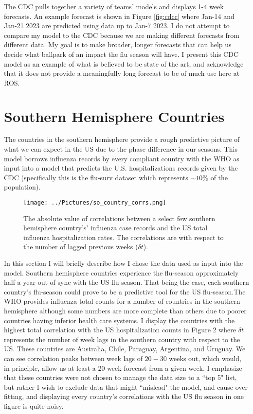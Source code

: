 \documentclass[12pt,a4paper,english]{article}
\begin{document}
The CDC pulls together a variety of teams' models and displays 1-4 week forecasts. An example forecast is shown in Figure \ref{fig:cdcc} where Jan-14 and Jan-21 2023 are predicted using data up to Jan-7 2023. I do not attempt to compare my model to the CDC because we are making different forecasts from different data. My goal is to make broader, longer forecasts that can help us decide what ballpark of an impact the flu season will have. I present this CDC model as an example of what is believed to be state of the art, and acknowledge that it does not provide a meaningfully long forecast to be of much use here at ROS. 




\section{Southern Hemisphere Countries}

The countries in the southern hemisphere provide a rough predictive picture of what we can expect in the US due to the phase difference in our seasons.  This model borrows influenza records by every compliant country with the WHO as input into a model that predicts the U.S. hospitalizations records given by the CDC (specifically this is the flu-surv dataset which represents $\sim10\%$ of the population).  

\begin{figure}[h!]
		\begin{center}
		\texttt{[image: ../Pictures/so\_country\_corrs.png]}
		\caption{The absolute value of correlations between a select few southern hemisphere country's' influenza case records and the US total influenza hospitalization rates. The correlations are with respect to the number of lagged previous weeks ($\delta t$).}
		\end{center}
		\label{fig:so_corrs}
	\end{figure}
\FloatBarrier

In this section I will briefly describe how I chose the data used as input into the model. Southern hemisphere countries experience the flu-season approximately half a year out of sync with the US flu-season. That being the case, each southern country's flu-season could prove to be a predictive tool for the US flu-season.The WHO provides influenza total counts for a number of countries in the southern hemisphere although some numbers are more complete than others due to poorer countries having inferior health care systems. I display the countries with the highest total correlation with the US hospitalization counts in Figure 2 where $\delta t $ represents the number of week lags in the southern country with respect to the US. These countries are Australia, Chile, Paraguay, Argentina, and Uruguay. We can see correlation peaks between week lags of $20-30$ weeks out, which would, in principle, allow us at least a 20 week forecast from a given week. I  emphasize that these countries were not chosen to manage the data size to a ``top 5" list, but rather I wish to exclude data that might ``mislead" the model, and cause over fitting, and displaying every country's correlations with the US flu season in one figure is quite noisy.
\end{document}
